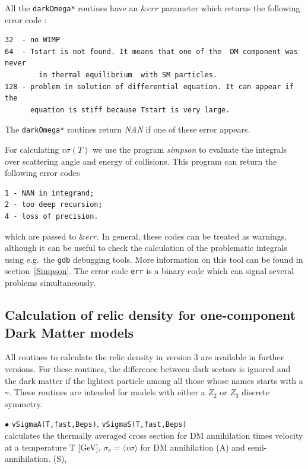\documentclass[12pt,a4paper]{article}
\begin{document}
All the {\tt darkOmega*} routines have an $\&err$ parameter  which  returns the following error code :
 
\begin{verbatim}
32  - no WIMP
64  - Tstart is not found. It means that one of the  DM component was never 
        in thermal equilibrium  with SM particles.
128 - problem in solution of differential equation. It can appear if the
      equation is stiff because Tstart is very large.
\end{verbatim}  
The {\tt darkOmega*} routines return {\it NAN} if one of these error  appears.
  
For calculating $v\sigma(T)$ we use the program {\it simpson} to evaluate the
integrals over scattering angle and energy of collisions. This
program can return the following   error codes  
\begin{verbatim} 
1 - NAN in integrand;
2 - too deep recursion;
4 - loss of precision.
\end{verbatim}
which are  passed to $\&err$.
In general, these codes can be treated as warnings, although it can be useful to 
check the calculation of the problematic integrals using e.g.\ the {\tt gdb} debugging tools. 
More information on this tool can be found  in section~\ref{Simpson}. The error code {\tt err} is a binary code which can signal several problems simultaneously. 

  

\subsection{Calculation of relic density for one-component Dark Matter models}
\label{sec:one_component}
All routines to calculate the relic density in  version 3 are  available in further versions. For these routines,  the difference between 
 dark sectors is ignored and the dark matter if the lightest particle among all those whose names starts with a \verb|~|. These routines are intended for models with either a $Z_2$ or $Z_3$ discrete symmetry.
  
\noindent
$\bullet$ \verb|vSigmaA(T,fast,Beps)|,  \verb|vSigmaS(T,fast,Beps)|\\
calculates the thermally averaged cross section for DM annihilation  times velocity  
at a  temperature T [GeV], $\sigma_v=\langle v\sigma \rangle$  for DM annihilation (A)  and semi-annihilation. (S), 
\end{document}
